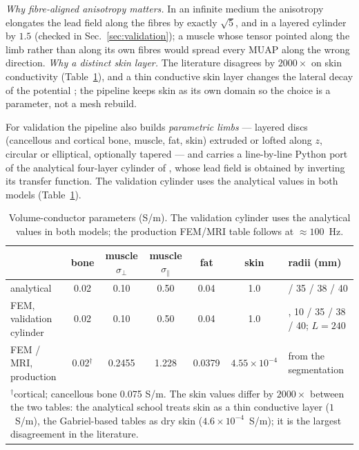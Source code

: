 \documentclass[11pt,a4paper]{article}
\begin{document}
\emph{Why fibre-aligned anisotropy matters.} In an infinite medium the anisotropy
elongates the lead field along the fibres by exactly $\sqrt{5}$, and in a layered
cylinder by $1.5$ (checked in Sec.~\ref{sec:validation}); a muscle whose tensor pointed
along the limb rather than along its own fibres would spread every MUAP along the wrong
direction. \emph{Why a distinct skin layer.} The literature disagrees by $2000\times$ on
skin conductivity (Table~\ref{tab:tissue}), and a thin conductive skin layer changes the
lateral decay of the potential \citep{blok2002three}; the pipeline keeps skin as its own
domain so the choice is a parameter, not a mesh rebuild.

For validation the pipeline also builds \emph{parametric limbs} --- layered discs
(cancellous and cortical bone, muscle, fat, skin) extruded or lofted along $z$, circular
or elliptical, optionally tapered --- and carries a line-by-line Python port of the
analytical four-layer cylinder of \citet{farina2004multilayer}, whose lead field is
obtained by inverting its transfer function. The validation cylinder uses the analytical
values in both models (Table~\ref{tab:tissue}).

\begin{table}[t]
\centering\small
\caption{Volume-conductor parameters (S/m). The validation cylinder uses the analytical
values in both models; the production FEM/MRI table follows \citet{gabriel1996dielectric}
at $\approx 100$~Hz.}
\label{tab:tissue}
\footnotesize\setlength{\tabcolsep}{4pt}
\begin{tabular}{lccccc>{\raggedright\arraybackslash}p{30mm}}
\toprule
 & bone & muscle $\sigma_\perp$ & muscle $\sigma_\parallel$ & fat & skin & radii (mm) \\
\midrule
analytical~\citep{farina2004multilayer} & 0.02 & 0.10 & 0.50 & 0.04 & 1.0 & 10 / 35 / 38 / 40 \\
FEM, validation cylinder & 0.02 & 0.10 & 0.50 & 0.04 & 1.0 & 9, 10 / 35 / 38 / 40; $L=240$ \\
FEM / MRI, production & 0.02$^{\dagger}$ & 0.2455 & 1.228 & 0.0379 & $4.55\times10^{-4}$ & from the segmentation \\
\bottomrule
\multicolumn{7}{p{150mm}}{$^{\dagger}$cortical; cancellous bone 0.075 S/m. The skin values differ by
$2000\times$ between the two tables: the analytical school treats skin as a thin conductive
layer ($1$~S/m), the Gabriel-based tables as dry skin ($4.6\times10^{-4}$~S/m); it is the
largest disagreement in the literature.}
\end{tabular}
\end{table}
\end{document}
